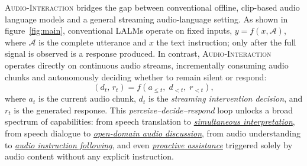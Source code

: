 \documentclass{article}
\begin{document}
 \textsc{Audio-Interaction}  bridges the gap between conventional offline, clip-based audio language models and a general streaming audio-language setting. As shown in figure~\ref{fig:main}, conventional LALMs operate on fixed inputs, $y = f(x, \mathcal{A})$, where $\mathcal{A}$ is the complete utterance and $x$ the text instruction; only after the full signal is observed is a response produced. In contrast,  \textsc{Audio-Interaction}  operates directly on continuous audio streams, incrementally consuming audio chunks and autonomously deciding whether to remain silent or respond:
\begin{equation}
    (d_t,\, r_t) = f\!\left(a_{\leq t},\; d_{<t},\; r_{<t}\right),
\end{equation}
where $a_t$ is the current audio chunk, $d_t$ is the \emph{streaming intervention decision}, and $r_t$ is the generated response. This \emph{perceive--decide--respond} loop unlocks a broad spectrum of capabilities: from speech translation to \underline{\emph{simultaneous interpretation}}, from speech dialogue to \underline{\emph{open-domain audio discussion}}, from audio understanding to \underline{\emph{audio instruction following}}, and even \underline{\emph{proactive assistance}} triggered solely by audio content without any explicit instruction.
\vspace{-1mm}

\end{document}
